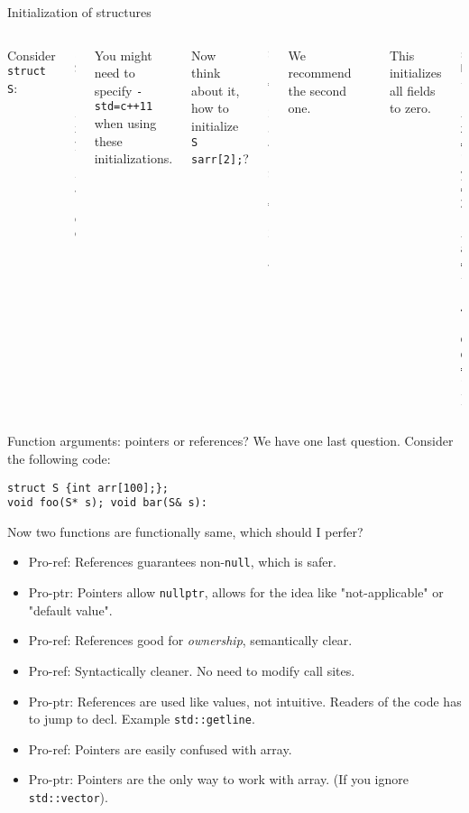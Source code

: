 \begin{frame}[fragile]{Initialization of structures}

\begin{columns}
	Consider \texttt{struct S}:
\begin{verbatim}
struct S {
    int x, y;
    int arr[2];
    double d;
};
\end{verbatim}
You might need to specify \texttt{-std=c++11} when using these initializations.

Now think about it, how to initialize \texttt{S sarr[2];}?

\begin{verbatim}
S s1 = {1, 2, 3, 4, 1.0};
S s2 = {1, 2, {3, 4}, 1.0};
\end{verbatim}
We recommend the second one.
	
\begin{verbatim}
S s1{};
\end{verbatim}
This initializes all fields to zero.

\begin{verbatim}
struct P {
    int x = 1, y = 2;  
    int arr[2] = {3 , 4}; 
    double d = 1.0;
};
\end{verbatim}
\end{columns}
\end{frame}

\begin{frame}[fragile]{Function arguments: pointers or references?}
We have one last question. Consider the following code:
\begin{verbatim}
struct S {int arr[100];};
void foo(S* s); void bar(S& s):
\end{verbatim}
Now two functions are functionally same, which should I perfer?

\begin{itemize}
	\item Pro-ref: References guarantees non-\texttt{null}, which is safer.
	\item Pro-ptr: Pointers allow \texttt{nullptr}, allows for the idea like "not-applicable" or "default value".
	\item Pro-ref: References good for \textit{ownership}, semantically clear.
	\item Pro-ref: Syntactically cleaner. No need to modify call sites.
	\item Pro-ptr: References are used like values, not intuitive. Readers of the code has to jump to decl. Example \texttt{std::getline}.
	\item Pro-ref: Pointers are easily confused with array.
	\item Pro-ptr: Pointers are the only way to work with array. (If you ignore \texttt{std::vector}).
	
\end{itemize}



\end{frame}